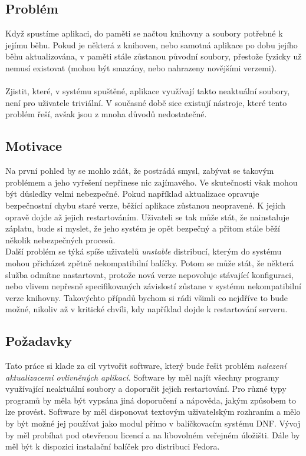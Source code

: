 \documentclass[10pt,a4paper]{article}
\begin{document}
		\subsection{Problém}
		Když spustíme aplikaci, do paměti se načtou knihovny a soubory potřebné k jejímu běhu. Pokud je některá z knihoven, nebo samotná aplikace po dobu jejího běhu aktualizována, v paměti stále zůstanou původní soubory, přestože fyzicky už nemusí existovat (mohou být smazány, nebo nahrazeny novějšími verzemi).
		\\\\
		Zjistit, které, v systému spuštěné, aplikace využívají takto neaktuální soubory, není pro uživatele triviální. V současné době sice existují nástroje, které tento problém řeší, avšak jsou z mnoha důvodů nedostatečné.

		\subsection{Motivace}
		Na první pohled by se mohlo zdát, že postrádá smysl, zabývat se takovým problémem a jeho vyřešení nepřinese nic zajímavého. Ve skutečnosti však mohou být důsledky velmi nebezpečné. Pokud například aktualizace opravuje bezpečnostní chybu staré verze, běžící aplikace zůstanou neopravené. K jejich opravě dojde až jejich restartováním. Uživateli se tak může stát, že nainstaluje záplatu, bude si myslet, že jeho systém je opět bezpečný a přitom stále běží několik nebezpečných procesů.
		\\
		Další problém se týká spíše uživatelů \textit{unstable} distribucí, kterým do systému mohou přicházet zpětně nekompatibilní balíčky. Potom se může stát, že některá služba odmítne nastartovat, protože nová verze nepovoluje stávající konfiguraci, nebo vlivem nepřesně specifikovaných závislostí zůstane v systému nekompatibilní verze knihovny. Takovýchto případů bychom si rádi všimli co nejdříve to bude možné, nikoliv až v kritické chvíli, kdy například dojde k restartování serveru.

		\subsection{Požadavky}
		Tato práce si klade za cíl vytvořit software, který bude řešit problém \textit{nalezení aktualizacemi ovlivněných aplikací}. Software by měl najít všechny programy využívající neaktuální soubory a doporučit jejich restartování. Pro různé typy programů by měla být vypsána jiná doporučení a nápověda, jakým způsobem to lze provést. Software by měl disponovat textovým uživatelským rozhraním a mělo by být možné jej používat jako modul přímo v balíčkovacím systému DNF\@. Vývoj by měl probíhat pod otevřenou licencí a na libovolném veřejném úložišti. Dále by měl být k dispozici instalační balíček pro distribuci Fedora.
\end{document}
